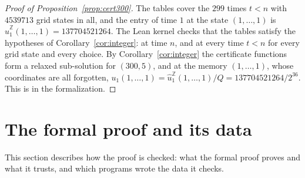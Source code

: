 \documentclass[11pt]{amsart}
\theoremstyle{definition}
\numberwithin{equation}{section}
\begin{document}
\begin{proof}[Proof of Proposition~\ref{prop:cert300}]
The tables cover the $299$ times $t<n$ with $4539713$ grid states in all, and the entry of time $1$ at the state $(1,\dots,1)$ is $\hat u^{\mathbb Z}_1(1,\dots,1)=137704521264$. The Lean kernel checks that the tables satisfy the hypotheses of Corollary~\ref{cor:integer}: at time $n$, and at every time $t<n$ for every grid state and every choice. By Corollary~\ref{cor:integer} the certificate functions form a relaxed sub-solution for $(300,5)$, and at the memory $(1,\dots,1)$, whose coordinates are all forgotten, $u_1(1,\dots,1)=\hat u^{\mathbb Z}_1(1,\dots,1)/Q=137704521264/2^{36}$. This is  in the formalization.
\end{proof}

\section{The formal proof and its data}\label{sec:formal}

This section describes how the proof is checked: what the formal proof proves and what it trusts, and which programs wrote the data it checks.
\end{document}
